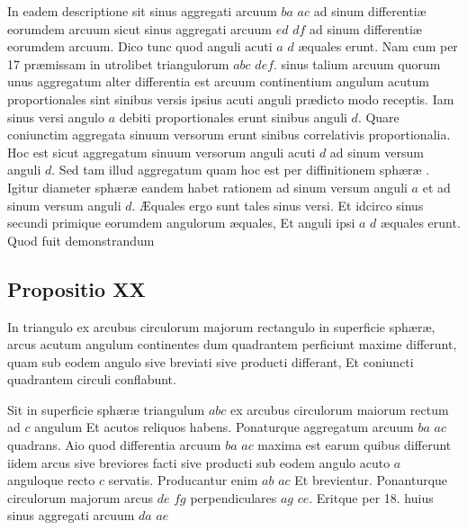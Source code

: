 \documentclass[11pt,a4paper]{article}
\begin{document}
In eadem descriptione sit sinus aggregati arcuum $ba$ $ac$ ad sinum differentiæ eorumdem arcuum sicut sinus aggregati arcuum $ed$ $df$  ad sinum differentiæ eorumdem arcuum. Dico tunc quod anguli acuti $a$ $d$ æquales erunt. Nam cum per 17 præmissam in utrolibet triangulorum $abc$ $def$. sinus talium  arcuum quorum unus aggregatum alter differentia est arcuum continentium angulum acutum proportionales sint sinibus versis ipsius acuti anguli prædicto modo receptis. Iam sinus versi angulo $a$ debiti proportionales erunt sinibus anguli $d$. Quare coniunctim aggregata sinuum versorum erunt sinibus correlativis proportionalia. Hoc est sicut aggregatum sinuum versorum anguli acuti $d$ ad sinum versum anguli $d$. Sed  tam illud aggregatum quam hoc est per diffinitionem sphæræ . Igitur diameter sphæræ eandem habet rationem ad sinum versum anguli $a$ et ad sinum versum anguli $d$. Æquales ergo sunt tales sinus versi. Et idcirco sinus secundi primique eorumdem angulorum æquales, Et anguli ipsi $a$ $d$ æquales erunt. Quod fuit demonstrandum

\subsection*{Propositio XX}

In triangulo ex arcubus circulorum majorum rectangulo in superficie sphæræ, arcus acutum angulum continentes dum quadrantem perficiunt maxime differunt, quam sub eodem angulo sive breviati sive producti differant, Et coniuncti quadrantem circuli conflabunt.

Sit in superficie sphæræ triangulum $abc$ ex arcubus circulorum maiorum rectum ad $c$ angulum Et acutos reliquos habens. Ponaturque aggregatum arcuum $ba$ $ac$ quadrans. Aio quod differentia arcuum $ba$ $ac$ maxima est earum quibus differunt iidem arcus sive breviores facti sive producti sub eodem angulo acuto $a$ anguloque recto $c$ servatis. Producantur enim $ab$ $ac$ Et brevientur. Ponanturque circulorum majorum arcus $de$ $fg$ perpendiculares $ag$ $ce$. Eritque per 18. huius sinus aggregati arcuum $da$ $ae$
\end{document}
